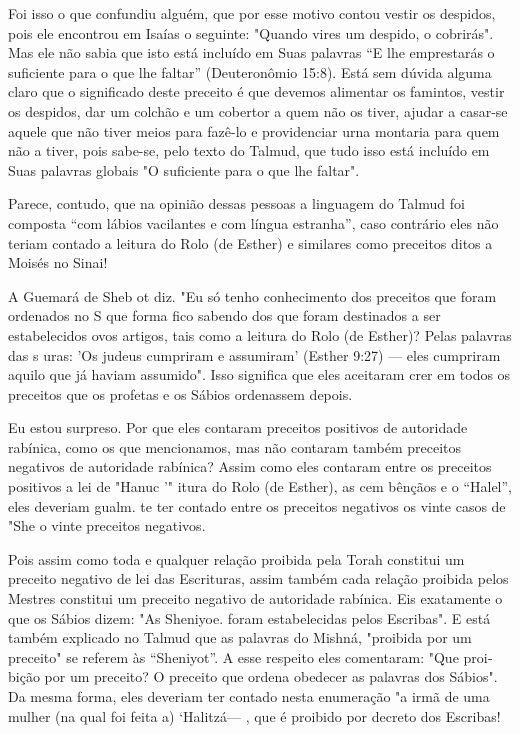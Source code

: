 Foi isso o que confundiu alguém, que por esse motivo contou vestir os
despidos, pois ele encontrou em Isaías o seguinte: "Quando vires um
despi­do, o cobrirás". Mas ele não sabia que isto está incluído em Suas
palavras ``E lhe emprestarás o suficiente para o que lhe faltar''
(Deuteronômio 15:8). Está sem dúvida alguma claro que o significado
deste preceito é que devemos ali­mentar os famintos, vestir os despidos,
dar um colchão e um cobertor a quem não os tiver, ajudar a casar-se
aquele que não tiver meios para fazê-lo e provi­denciar urna montaria
para quem não a tiver, pois sabe-se, pelo texto do Tal­mud, que tudo
isso está incluído em Suas palavras globais "O suficiente para o que lhe
faltar".

Parece, contudo, que na opinião dessas pessoas a linguagem do Tal­mud
foi composta ``com lábios vacilantes e com língua estranha'', caso
contrá­rio eles não teriam contado a leitura do Rolo (de Esther) e
similares como pre­ceitos ditos a Moisés no Sinai!


A Guemará de Sheb ot diz. "Eu só tenho conhecimento dos preceitos 
que foram ordenados no S que forma fico sabendo dos que foram
destinados a ser estabelecidos ovos artigos, tais como a leitura do Rolo
(de Esther)? Pelas palavras das s uras: 'Os judeus cumpriram e
assumiram' (Esther 9:27) --- eles cumpriram aquilo que já haviam
assumido". Isso significa que eles aceitaram crer em todos os preceitos
que os profetas e os Sábios orde­nassem depois.

Eu estou surpreso. Por que eles contaram preceitos positivos de
au­toridade rabínica, como os que mencionamos, mas não contaram também
pre­ceitos negativos de autoridade rabínica? Assim como eles contaram
entre os pre­ceitos positivos a lei de "Hanuc '" itura do Rolo (de
Esther), as cem bên­çãos e o ``Halel'', eles deveriam gualm. te ter
contado entre os preceitos ne­gativos os vinte casos de "She o vinte
preceitos negativos. 
  
 
 
 
Pois assim como toda e qualquer relação proibida pela Torah constitui um
preceito negativo de lei das Escrituras, assim também cada relação
proibida pelos Mes­tres constitui um preceito negativo de autoridade
rabínica. Eis exatamente o que os Sábios dizem: "As
Sheniyoe. foram estabelecidas pelos Escribas". E es­tá
também explicado no Talmud que as palavras do Mishná, "proibida por um
preceito" se referem às ``Sheniyot''. A esse respeito eles comentaram:
"Que proi­bição por um preceito? O preceito que ordena obedecer as
palavras dos Sá­bios". Da mesma forma, eles deveriam ter contado nesta
enumeração "a irmã de uma mulher (na qual foi feita a)
`Halitzá--- , que é proibido por decreto dos Escribas!

